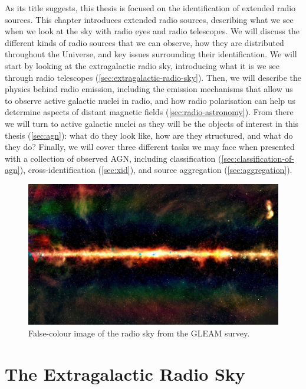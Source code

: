 \documentclass[11pt, a4paper]{book}
\begin{document}
    As its title suggests, this thesis is focused on the identification of extended radio sources. This chapter introduces extended radio sources, describing what we see when we look at the sky with radio eyes and radio telescopes. We will discuss the different kinds of radio sources that we can observe, how they are distributed throughout the Universe, and key issues surrounding their identification. We will start by looking at the extragalactic radio sky, introducing what it is we see through radio telescopes (\autoref{sec:extragalactic-radio-sky}). Then, we will describe the physics behind radio emission, including the emission mechanisms that allow us to observe active galactic nuclei in radio, and how radio polarisation can help us determine aspects of distant magnetic fields (\autoref{sec:radio-astronomy}). From there we will turn to active galactic nuclei as they will be the objects of interest in this thesis (\autoref{sec:agn}): what do they look like, how are they structured, and what do they do? Finally, we will cover three different tasks we may face when presented with a collection of observed AGN, including classification (\autoref{sec:classification-of-agn}), cross-identification (\autoref{sec:xid}), and source aggregation (\autoref{sec:aggregation}).

    \begin{figure}[ht]
        \includegraphics[width=\textwidth]{images/gleam.jpg}
        \caption[False-colour image of the radio sky from the GLEAM survey.]{\label{fig:gleam} False-colour image of the radio sky from the GLEAM survey. \citep[Image: Natasha Hurley-Walker, Curtin University/ICRAR;][]{hurley-walker_galactic_2017}}
    \end{figure}

\section{The Extragalactic Radio Sky}
\label{sec:extragalactic-radio-sky}
\end{document}
